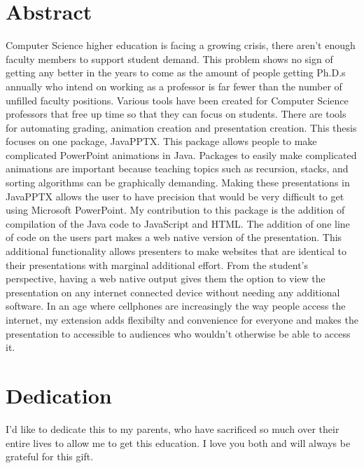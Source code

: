 \documentclass[12pt,twoside]{reedthesis}
\begin{document}
    \chapter*{Abstract}
	Computer Science higher education is facing a growing crisis, there aren't enough faculty members to support student demand. This problem shows no sign of getting any better in the years to come as the amount of people getting Ph.D.s annually who intend on working as a professor is far fewer than the number of unfilled faculty positions. Various tools have been created for Computer Science professors that free up time so that they can focus on students. There are tools for automating grading, animation creation and presentation creation. This thesis focuses on one package, JavaPPTX. This package allows people to make complicated PowerPoint animations in Java. Packages to easily make complicated animations are important because teaching topics such as recursion, stacks, and sorting algorithms  can be graphically demanding. Making these presentations in JavaPPTX allows the user to have precision that would be very difficult to get using Microsoft PowerPoint. My contribution to this package is the addition of compilation of the Java code to JavaScript and HTML. The addition of one line of code on the users part makes a web native version of the presentation. This additional functionality allows presenters to make websites that are identical to their presentations with marginal additional effort. From the student's perspective, having a web native output gives them the option to view the presentation on any internet connected device without needing any additional software. In an age where cellphones are increasingly the way people access the internet, my extension adds flexibilty and convenience for everyone and makes the presentation to accessible to audiences who wouldn't otherwise be able to access it. 
	
	\chapter*{Dedication}
	I'd like to dedicate this to my parents, who have sacrificed so much over their entire lives to allow me to get this education. I love you both and will always be grateful for this gift. 

  \mainmatter %
  \pagestyle{fancyplain} %
\end{document}
